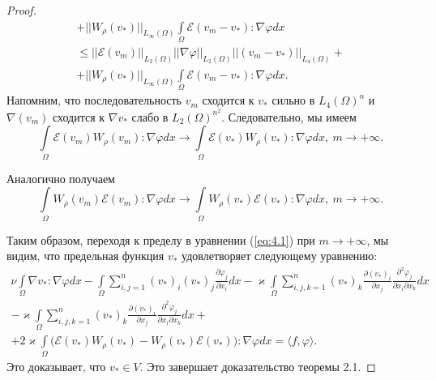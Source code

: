 \begin{proof}
\begin{equation*}
\begin{gathered}
            + ||W_\rho(v_*)||_{L_\infty(\Omega)} \int\limits_{\Omega}\mathcal{E}(v_m - v_*): \nabla\varphi dx\\
            \leq ||\mathcal{E}(v_m)||_{L_2(\Omega)}||\nabla\varphi||_{L_2(\Omega)}||(v_m - v_*)||_{L_4(\Omega)} +\\
            + ||W_\rho(v_*)||_{L_\infty(\Omega)} \int\limits_{\Omega}\mathcal{E}(v_m - v_*): \nabla\varphi dx.
        \end{gathered}
    \end{equation*}
    Напомним, что последовательность $v_m$ сходится к $v_*$ сильно в $L_4(\Omega)^n$
    и $\nabla(v_m)$ сходится к $\nabla v_*$ слабо в $L_2(\Omega)^{n^2}$.
    Следовательно, мы имеем
    $$\int\limits_{\Omega}\mathcal{E}(v_m) W_\rho(v_m): \nabla\varphi dx \rightarrow
    \int\limits_{\Omega}\mathcal{E}(v_*) W_\rho(v_*): \nabla\varphi dx, \ m \rightarrow +\infty.$$

    Аналогично получаем
    $$\int\limits_{\Omega}W_\rho(v_m)\mathcal{E}(v_m): \nabla\varphi dx \rightarrow
    \int\limits_{\Omega}W_\rho(v_*)\mathcal{E}(v_*): \nabla\varphi dx, \ m \rightarrow +\infty.$$

    Таким образом, переходя к пределу в уравнении (\ref{eq:4.1}) при $m \rightarrow +\infty$,
    мы видим, что предельная функция $v_*$ удовлетворяет следующему уравнению:
    \begin{equation*}
        \begin{gathered}
            \nu\int\limits_{\Omega}\nabla v_*: \nabla\varphi dx -
            \int\limits_{\Omega}\sum_{i,j=1}^n (v_*)_i (v_*)_j \frac{\partial \varphi_j}{\partial x_i} dx
            - \varkappa \int\limits_{\Omega}\sum_{i,j,k=1}^n (v_*)_k \frac{\partial (v_*)_i}{\partial x_j}
            \frac{\partial^2 \varphi_j}{\partial x_i \partial x_k} dx \\
            - \varkappa \int\limits_{\Omega}\sum_{i,j,k=1}^n (v_*)_k \frac{\partial (v_*)_i}{\partial x_j}
            \frac{\partial^2 \varphi_j}{\partial x_i \partial x_k} dx + \\ + 2 \varkappa
            \int\limits_{\Omega}\bigg(\mathcal{E}(v_*) W_\rho(v_*) - W_\rho(v_*)\mathcal{E}(v_*)\bigg): \nabla\varphi dx = \langle f, \varphi \rangle.
        \end{gathered}
    \end{equation*}
    Это доказывает, что $v_* \in V$. Это завершает доказательство теоремы 2.1.
\end{proof}

